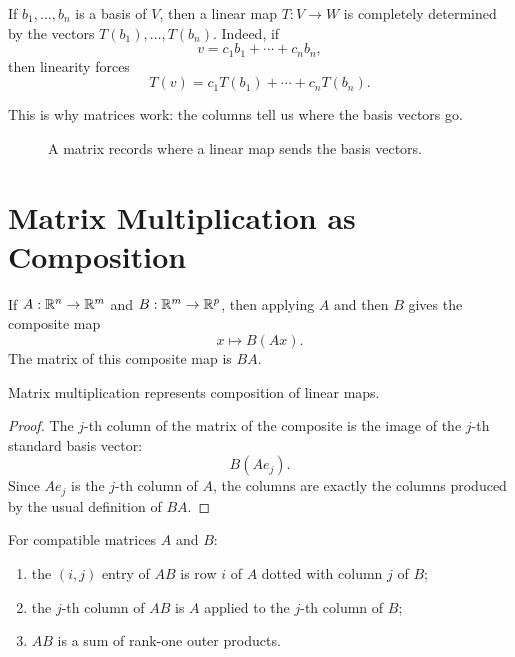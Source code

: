 If $b_1,\ldots,b_n$ is a basis of $V$, then a linear map $T:V\to W$ is
completely determined by the vectors $T(b_1),\ldots,T(b_n)$. Indeed, if
\[
  v=c_1b_1+\cdots+c_nb_n,
\]
then linearity forces
\[
  T(v)=c_1T(b_1)+\cdots+c_nT(b_n).
\]

This is why matrices work: the columns tell us where the basis vectors go.

\begin{figure}[h]
  \centering
  \caption{A matrix records where a linear map sends the basis vectors.}
\end{figure}

\section{Matrix Multiplication as Composition}

If $A:\mathbb{R}^n\to\mathbb{R}^m$ and $B:\mathbb{R}^m\to\mathbb{R}^p$, then applying $A$ and then $B$ gives
the composite map
\[
  x\mapsto B(Ax).
\]
The matrix of this composite map is $BA$.

\begin{theorem}
  Matrix multiplication represents composition of linear maps.
\end{theorem}

\begin{proof}
  The $j$-th column of the matrix of the composite is the image of the $j$-th
  standard basis vector:
  \[
    B(Ae_j).
  \]
  Since $Ae_j$ is the $j$-th column of $A$, the columns are exactly the
  columns produced by the usual definition of $BA$.
\end{proof}

\begin{proposition}
For compatible matrices $A$ and $B$:
\begin{enumerate}
  \item the $(i,j)$ entry of $AB$ is row $i$ of $A$ dotted with column $j$
  of $B$;
  \item the $j$-th column of $AB$ is $A$ applied to the $j$-th column of
  $B$;
  \item $AB$ is a sum of rank-one outer products.
\end{enumerate}
\end{proposition}

